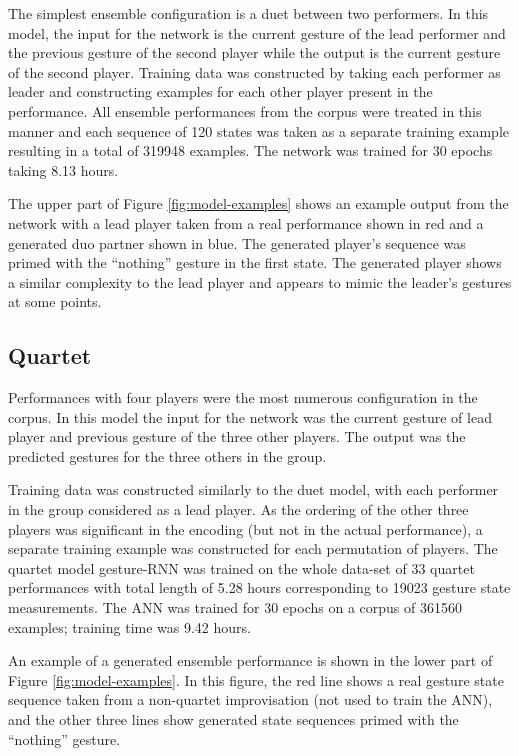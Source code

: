 \documentclass[sigchi]{acmart} %
\begin{document}
The simplest ensemble configuration is a duet between two performers.
In this model, the input for the network is the current gesture of the
lead performer and the previous gesture of the second player while the
output is the current gesture of the second player. Training data was
constructed by taking each performer as leader and constructing
examples for each other player present in the performance. All
ensemble performances from the corpus were treated in this manner and
each sequence of 120 states was taken as a separate training example
resulting in a total of 319948 examples. The network was trained for
30 epochs taking 8.13 hours.

The upper part of Figure \ref{fig:model-examples} shows an example
output from the network with a lead player taken from a real
performance shown in red and a generated duo partner shown in blue.
The generated player's sequence was primed with the ``nothing''
gesture in the first state. The generated player shows a similar
complexity to the lead player and appears to mimic the leader's
gestures at some points.

\subsection{Quartet}

Performances with four players were the most numerous 
configuration in the corpus. In this model the input for the network
was the current gesture of lead player and previous gesture of the
three other players. The output was the predicted gestures for the
three others in the group.

Training data was constructed similarly to the duet model, with each
performer in the group considered as a lead player. As the ordering of
the other three players was significant in the encoding (but not in
the actual performance), a separate training example was constructed
for each permutation of players. The quartet model gesture-RNN was
trained on the whole data-set of 33 quartet performances with total
length of 5.28 hours corresponding to 19023 gesture state
measurements. The ANN was trained for 30 epochs on a corpus of 361560
examples; training time was 9.42 hours.

An example of a generated ensemble performance is shown in the lower
part of Figure \ref{fig:model-examples}. In this figure, the red line
shows a real gesture state sequence taken from a non-quartet
improvisation (not used to train the ANN), and the other three lines
show generated state sequences primed with the ``nothing'' gesture.
\end{document}
